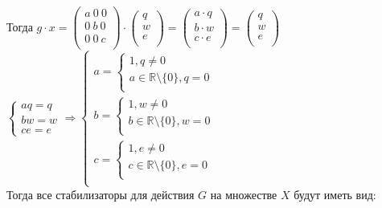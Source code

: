 \documentclass[12pt,a4paper]{scrartcl}
\begin{document}
	Тогда $g \cdot x = \begin{pmatrix}
	a~0~0\\
	0~b~0\\
	0~0~c\\
	\end{pmatrix} \cdot \begin{pmatrix}
	q\\
	w\\
	e\\
	\end{pmatrix} = \begin{pmatrix}
	a\cdot q\\
	b \cdot w\\
	c \cdot e\\
	\end{pmatrix} = \begin{pmatrix}
	q\\
	w\\
	e\\
	\end{pmatrix}$\\
	$\begin{cases}
	aq = q\\
	bw = w\\
	ce = e
	\end{cases} \Rightarrow \begin{cases}
	a = \begin{cases}
	1, q \neq 0 \\
	a \in \mathbb{R} \setminus \{0\}, q = 0\\
	\end{cases} \\
	b = \begin{cases}
	1, w \neq 0 \\
	b \in \mathbb{R} \setminus \{0\}, w = 0\\
	\end{cases} \\
	c = \begin{cases}
	1, e \neq 0 \\
	c \in \mathbb{R} \setminus \{0\}, e = 0\\
	\end{cases} \\
		\end{cases}$\\
	Тогда все стабилизаторы для действия $G$ на множестве $X$ будут иметь вид:
\end{document}
